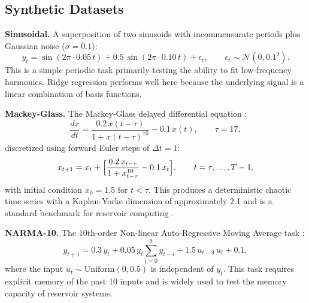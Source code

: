 
\subsection{Synthetic Datasets}


\textbf{Sinusoidal.} A superposition of two sinusoids with incommensurate
periods plus Gaussian noise ($\sigma=0.1$):
\begin{equation}
y_t = \sin(2\pi \cdot 0.05 \, t) + 0.5\,\sin(2\pi \cdot 0.10 \, t) + \epsilon_t,
\qquad \epsilon_t \sim \mathcal{N}(0, 0.1^2).
\end{equation}
This is a simple periodic task primarily testing the ability to fit
low-frequency harmonics. Ridge regression performs well here because the
underlying signal is a linear combination of basis functions.


\textbf{Mackey-Glass.} The Mackey-Glass delayed differential equation
\citep{mackey1977}:
\begin{equation}
\frac{dx}{dt} = \frac{0.2\, x(t-\tau)}{1 + x(t-\tau)^{10}} - 0.1\, x(t),
\qquad \tau = 17,
\end{equation}
discretized using forward Euler steps of $\Delta t = 1$:
\begin{equation}
x_{t+1} = x_t + \Bigl[
  \frac{0.2\, x_{t-\tau}}{1 + x_{t-\tau}^{10}} - 0.1\, x_t \Bigr],
\qquad t = \tau, \ldots, T-1,
\end{equation}
with initial condition $x_0 = 1.5$ for $t < \tau$. This produces a
deterministic chaotic time series with a Kaplan-Yorke dimension of
approximately 2.1 and is a standard benchmark for reservoir computing
\citep{jaeger2004harnessing, jaeger2007echo}.


\textbf{NARMA-10.} The 10th-order Non-linear Auto-Regressive Moving Average
task \citep{ganguli2004memory}:
\begin{equation}
y_{t+1} = 0.3\, y_t + 0.05\, y_t \sum_{i=0}^{9} y_{t-i}
          + 1.5\, u_{t-9}\, u_t + 0.1,
\end{equation}
where the input $u_t \sim \mathrm{Uniform}(0, 0.5)$ is independent of $y_t$.
This task requires explicit memory of the past 10 inputs and is widely
used to test the memory capacity of reservoir systems.

